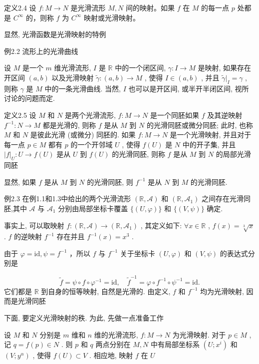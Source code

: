 定义2.4 设  $f: M \to N$  是光滑流形  $M, N$  间的映射。如果  $f$  在  $M$  的每一点  $p$  处都是  $C^\infty$  的，则称  $f$  为  $C^\infty$  映射或光滑映射。

显然, 光滑函数是光滑映射的特例

例2.2 流形上的光滑曲线

设  $M$  是一个  $m$  维光滑流形,  $I$  是  $\mathbb{R}$  中的一个闭区间,  $\gamma: I \to M$  是映射, 如果存在开区间  $(a, b)$  以及光滑映射  $\tilde{\gamma}: (a, b) \to M$ , 使得  $I \in (a, b)$ , 并且  $\tilde{\gamma}|_{I} = \gamma$ , 则称  $\gamma$  是  $M$  中的一条光滑曲线. 当然,  $I$  也可以是开区间, 或半开半闭区间, 视所讨论的问题而定.

定义2.5 设  $M$  和  $N$  是两个光滑流形,  $f: M \to N$  是一个同胚如果  $f$  及其逆映射  $f^{-1}: N \to M$  都是光滑的, 则称  $f$  是从  $M$  到  $N$  的光滑同胚或微分同胚; 此时, 也称  $M$  和  $N$  是彼此光滑 (或微分) 同胚的. 如果  $f: M \to N$  是一个光滑映射, 并且对于每一点  $p \in M$  都有  $p$  的一个开邻域  $U$ , 使得  $f(U)$  是  $N$  中的开子集, 并且  $|f|_U: U \to f(U)$  是从  $U$  到  $f(U)$  的光滑同胚, 则称  $f$  是从  $M$  到  $N$  的局部光滑同胚

显然, 如果  $f$  是从  $M$  到  $N$  的光滑同胚, 则  $f^{-1}$  是从  $N$  到  $M$  的光滑同胚.

例2.3 在例1.1和1.3中给出的两个光滑流形  $(\mathbb{R},\mathcal{A})$  和  $(\mathbb{R},\mathcal{A}_1)$  之间存在光滑同胚,其中  $\mathcal{A}$  与  $\mathcal{A}_1$  分别由局部坐标卡覆盖  $\{(U,\varphi)\}$  和  $\{(V,\psi)\}$  确定.

事实上, 可以取映射  $f: (\mathbb{R}, \mathcal{A}) \to (\mathbb{R}, \mathcal{A}_1)$ , 其定义如下:  $\forall x \in \mathbb{R}$ ,  $f(x) = \sqrt[3]{x}$ .  $f$  的逆映射  $f^{-1}$  存在并且  $f^{-1}(x) = x^3$ .

由于  $\varphi = \mathrm{id},\psi = f^{-1}$  ，所以  $f$  与  $f^{-1}$  关于坐标卡  $(U,\varphi)$  和  $(V,\psi)$  的表达式分别是

$$
\tilde {f} = \psi \circ f \circ \varphi^ {- 1} = \mathrm {i d}, \quad \tilde {f} ^ {- 1} = \varphi \circ f ^ {- 1} \circ \psi^ {- 1} = \mathrm {i d}.
$$
它们都是  $\mathbb{R}$  到自身的恒等映射, 自然是光滑的. 由定义,  $f$  和  $f^{-1}$  均为光滑映射, 因而是光滑同胚

下面, 要定义光滑映射的秩. 为此, 先做一点准备工作

设  $M$  和  $N$  分别是  $m$  维和  $n$  维的光滑流形,  $f: M \to N$  为光滑映射. 对于  $p \in M$ , 记  $q = f(p) \in N$ . 则  $p$  和  $q$  两点分别在  $M, N$  中有局部坐标系  $(U; x^i)$  和  $(V; y^\alpha)$ , 使得  $f(U) \subset V$ . 相应地, 映射  $f$  在  $U$

